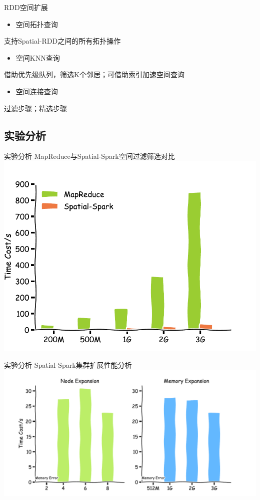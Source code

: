 \begin{frame}[c]{RDD空间扩展}
    \begin{itemize}
        \item \alert{空间拓扑查询}
    \end{itemize}
    支持Spatial-RDD之间的所有拓扑操作

    \pause
    \begin{itemize}
        \item \alert{空间KNN查询}
    \end{itemize}
    借助优先级队列，筛选K个邻居；可借助索引加速空间查询

    \pause
    \begin{itemize}
        \item \alert{空间连接查询}
    \end{itemize}
    过滤步骤；精选步骤
\end{frame}
\subsection{实验分析}

\begin{frame}[t]{实验分析}
    MapReduce与Spatial-Spark空间过滤筛选对比
    \vspace{1em}
    \includegraphics[width=0.9 \textwidth]{figures/topo_query.pdf}
\end{frame}

\begin{frame}[t]{实验分析}
    Spatial-Spark集群扩展性能分析
    \vspace{1em}
    \includegraphics[width=0.9 \textwidth]{figures/node_memory.pdf}
\end{frame}

